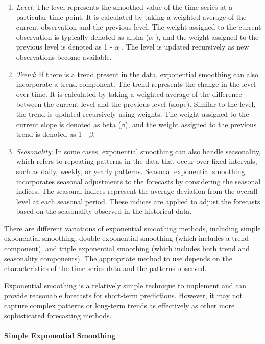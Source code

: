 \documentclass[
]{article}
\providecommand{\tightlist}{%
  \setlength{\itemsep}{0pt}\setlength{\parskip}{0pt}}
\begin{document}
\begin{enumerate}
\def\labelenumi{\arabic{enumi}.}
\tightlist
\item
  \emph{Level}: The level represents the smoothed value of the time
  series at a particular time point. It is calculated by taking a
  weighted average of the current observation and the previous level.
  The weight assigned to the current observation is typically denoted as
  alpha (\(\alpha\) ), and the weight assigned to the previous level is
  denoted as 1 - \(\alpha\) . The level is updated recursively as new
  observations become available.
\item
  \emph{Trend}: If there is a trend present in the data, exponential
  smoothing can also incorporate a trend component. The trend represents
  the change in the level over time. It is calculated by taking a
  weighted average of the difference between the current level and the
  previous level (slope). Similar to the level, the trend is updated
  recursively using weights. The weight assigned to the current slope is
  denoted as beta (\(\beta\)), and the weight assigned to the previous
  trend is denoted as 1 - \(\beta\).
\item
  \emph{Seasonality}: In some cases, exponential smoothing can also
  handle seasonality, which refers to repeating patterns in the data
  that occur over fixed intervals, such as daily, weekly, or yearly
  patterns. Seasonal exponential smoothing incorporates seasonal
  adjustments to the forecasts by considering the seasonal indices. The
  seasonal indices represent the average deviation from the overall
  level at each seasonal period. These indices are applied to adjust the
  forecasts based on the seasonality observed in the historical data.
\end{enumerate}

There are different variations of exponential smoothing methods,
including simple exponential smoothing, double exponential smoothing
(which includes a trend component), and triple exponential smoothing
(which includes both trend and seasonality components). The appropriate
method to use depends on the characteristics of the time series data and
the patterns observed.

Exponential smoothing is a relatively simple technique to implement and
can provide reasonable forecasts for short-term predictions. However, it
may not capture complex patterns or long-term trends as effectively as
other more sophisticated forecasting methods.

\hypertarget{simple-exponential-smoothing}{%
\paragraph{Simple Exponential
Smoothing}\label{simple-exponential-smoothing}}
\end{document}
